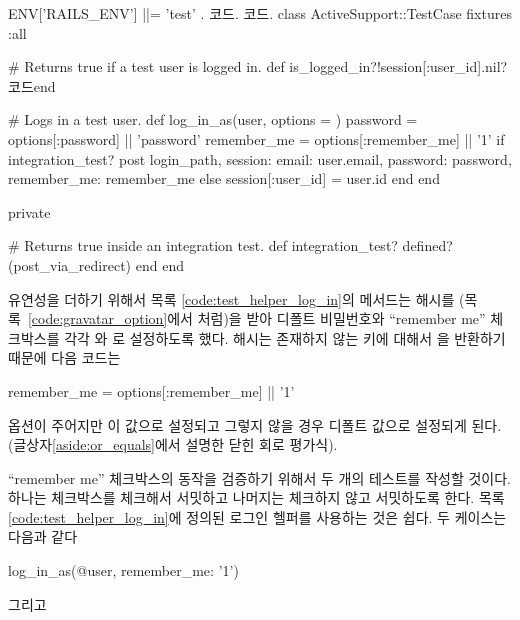 {{\begin{codelisting} \label{code:test_helper_log_in}  

\begin{code} ENV['RAILS_ENV'] ||= 'test' . 코드. 코드. class ActiveSupport::TestCase fixtures :all 

# Returns true if a test user is logged in. def is_logged_in?!session[:user_id].nil?코드end 

# Logs in a test user. def log_in_as(user, options = {}) password = options[:password] || 'password' remember_me = options[:remember_me] || '1' if integration_test? post login_path, session: { email: user.email, password: password, remember_me: remember_me } else session[:user_id] = user.id end end 

private 

# Returns true inside an integration test. def integration_test? defined?(post_via_redirect) end end \end{code} \end{codelisting} 

\noindent 유연성을 더하기 위해서 목록 \ref{code:test_helper_log_in}의  메서드는  해시를 (목록~\ref{code:gravatar_option}에서 처럼)을 받아 디폴트 비밀번호와 ``remember me'' 체크박스를 각각 와 로 설정하도록 했다. 해시는 존재하지 않는 키에 대해서 을 반환하기 때문에 다음 코드는 

\begin{code} remember_me = options[:remember_me] || '1' \end{code} 

\noindent 옵션이 주어지만 이 값으로 설정되고 그렇지 않을 경우 디폴트 값으로 설정되게 된다. (글상자\ref{aside:or_equals}에서 설명한 닫힌 회로 평가식). 

 ``remember me'' 체크박스의 동작을 검증하기 위해서 두 개의 테스트를 작성할 것이다. 하나는 체크박스를 체크해서 서밋하고 나머지는 체크하지 않고 서밋하도록 한다. 목록 \ref{code:test_helper_log_in}에 정의된 로그인 헬퍼를 사용하는 것은 쉽다. 두 케이스는 다음과 같다 

\begin{code} log_in_as(@user, remember_me: '1') \end{code} 

\noindent 그리고 

}}
